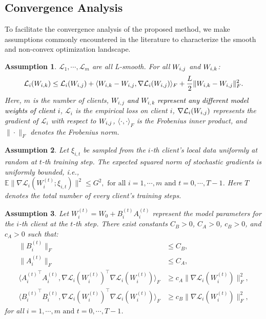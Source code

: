 \documentclass{article} %
\newtheorem{assumption}{Assumption}
\newcommand{\pengxin}[1]{\textcolor{black}{#1}}
\begin{document}
\subsection{Convergence Analysis}

To facilitate the convergence analysis of the proposed method, we make assumptions commonly encountered in the literature \citep{li2019convergence} to characterize the smooth and non-convex optimization landscape. 

\begin{assumption} 
\label{assumption1}
$\mathcal{L}_1, \cdots, \mathcal{L}_m$ are all L-smooth. For all $\pengxin{W_{i,j}}$ and $\pengxin{W_{i,k}}$:
\begin{equation*}
    \mathcal{L}_i(\pengxin{W_{i,k}}) \leq \notag \mathcal{L}_i(\pengxin{W_{i,j}}) + \langle \pengxin{W_{i,k}}-\pengxin{W_{i,j}},\nabla \mathcal{L}_i(\pengxin{W_{i,j}})\rangle_F+\frac{L}{2}\|\pengxin{W_{i,k}}-\pengxin{W_{i,j}}\|_F^2.
\end{equation*}
Here, $m$ is the number of clients, \pengxin{$W_{i,j}$ and $W_{i,k}$ represent any different model weights of client $i$}, $\mathcal{L}_i$ is the empirical loss on client $i$, $\nabla \mathcal{L}_i(\pengxin{W_{i,j}})$ represents the gradient of $\mathcal{L}_i$ with respect to $\pengxin{W_{i,j}}$, $\langle \cdot,\cdot \rangle_F$ is the Frobenius inner product, and $\|\cdot\|_F$ denotes the Frobenius norm.
\end{assumption}
\begin{assumption}
\label{assumption2}
Let $\xi_{i,t}$ be sampled from the $i$-th client's local data uniformly at random at $t$-th training step. The expected squared norm of stochastic gradients is uniformly bounded, i.e., 
$\mathbb{E}\|\nabla \mathcal{L}_i(W_i^{(t)};\xi_{i,t})\|^2 \leq G^2,\text{~for all~} i=1,\cdots, m \text{ and } t=0, \cdots, T-1$. Here $T$ denotes the total number of every client's training steps.
\end{assumption}
\begin{assumption}
\label{assumption3}
Let $W_i^{(t)}=W_0+B_i^{(t)}A_i^{(t)}$ represent the model parameters for the $i$-th client at the $t$-th step. There exist constants $C_B>0$, $C_A>0$, $c_B > 0$, and $c_A > 0$ such that:
\begin{equation*}
    \begin{aligned}
        \|B_i^{(t)}\|_F &\leq C_B, \\
        \|A_i^{(t)}\|_F &\leq C_A, \\
        \langle {A_i^{(t)}}^{\top}A_i^{(t)}, \nabla \mathcal{L}_i(W_i^{(t)})^{\top}\nabla \mathcal{L}_i(W_i^{(t)})\rangle_F &\geq c_A \|\nabla \mathcal{L}_i(W_i^{(t)})\|_F^2, \\
        \langle {B_i^{(t)}}^{\top}B_i^{(t)}, \nabla \mathcal{L}_i(W_i^{(t)})^{\top}\nabla \mathcal{L}_i(W_i^{(t)})\rangle_F & \geq c_B \|\nabla \mathcal{L}_i(W_i^{(t)})\|_F^2,
    \end{aligned}
\end{equation*}
for all $i=1,\cdots,m \text{ and } t=0, \cdots, T-1$.
\end{assumption}
\end{document}
